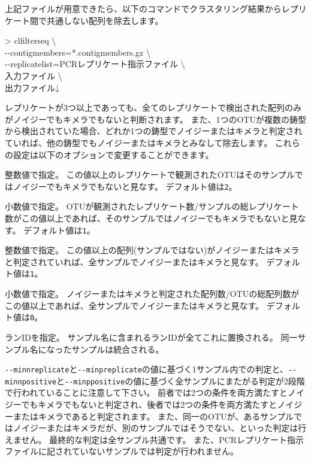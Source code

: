 \documentclass[titlepage,10pt,a4paper]{jsbook}
\newenvironment{cmd}{\begin{oframed}\raggedright\ttfamily\footnotesize\setlength{\baselineskip}{1.4em}}{\end{oframed}\vspace{-1em}}
\begin{document}
上記ファイルが用意できたら、以下のコマンドでクラスタリング結果からレプリケート間で共通しない配列を除去します。
\begin{cmd}
{\textgreater} clfilterseq {\textbackslash}\\
{-}{-}contigmembers=*.contigmembers.gz {\textbackslash}\\
{-}{-}replicatelist=PCRレプリケート指示ファイル {\textbackslash}\\
入力ファイル {\textbackslash}\\
出力ファイル↓
\end{cmd}
レプリケートが3つ以上であっても、全てのレプリケートで検出された配列のみがノイジーでもキメラでもないと判断されます。
また、1つのOTUが複数の鋳型から検出されていた場合、どれか1つの鋳型でノイジーまたはキメラと判定されていれば、他の鋳型でもノイジーまたはキメラとみなして除去します。
これらの設定は以下のオプションで変更することができます。
\begin{description}\small\setlength{\baselineskip}{1.1em}
\item[\texttt{{-}{-}minnreplicate}] 整数値で指定。
この値以上のレプリケートで観測されたOTUはそのサンプルではノイジーでもキメラでもないと見なす。
デフォルト値は\texttt{2}。
\item[\texttt{{-}{-}minpreplicate}] 小数値で指定。
OTUが観測されたレプリケート数/サンプルの総レプリケート数がこの値以上であれば、そのサンプルではノイジーでもキメラでもないと見なす。
デフォルト値は\texttt{1}。
\item[\texttt{{-}{-}minnpositive}] 整数値で指定。
この値以上の配列(サンプルではない)がノイジーまたはキメラと判定されていれば、全サンプルでノイジーまたはキメラと見なす。
デフォルト値は\texttt{1}。
\item[\texttt{{-}{-}minppositive}] 小数値で指定。
ノイジーまたはキメラと判定された配列数/OTUの総配列数がこの値以上であれば、全サンプルでノイジーまたはキメラと見なす。
デフォルト値は\texttt{0}。
\item[\texttt{{-}{-}runname}] ランIDを指定。
サンプル名に含まれるランIDが全てこれに置換される。
同一サンプル名になったサンプルは統合される。
\end{description}
\texttt{{-}{-}minnreplicate}と\texttt{{-}{-}minpreplicate}の値に基づく1サンプル内での判定と、\texttt{{-}{-}minnpositive}と\texttt{{-}{-}minppositive}の値に基づく全サンプルにまたがる判定が2段階で行われていることに注意して下さい。
前者では2つの条件を両方満たすとノイジーでもキメラでもないと判定され、後者では2つの条件を両方満たすとノイジーまたはキメラであると判定されます。
また、同一のOTUが、あるサンプルではノイジーまたはキメラだが、別のサンプルではそうでない、といった判定は行えません。
最終的な判定は全サンプル共通です。
また、PCRレプリケート指示ファイルに記されていないサンプルでは判定が行われません。
\end{document}
